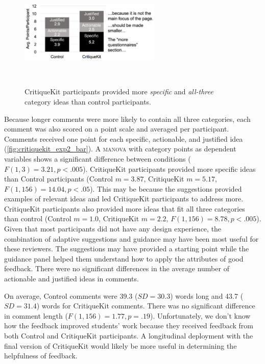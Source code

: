 \begin{figure}[b!]
\centering
  \includegraphics[width=0.6\textwidth]{critiquekit/figures/exp2_bar.png}
  \caption{CritiqueKit participants provided more \textit{specific} and \textit{all-three} category ideas than control participants.}~\label{fig:critiquekit_exp2_bar}
\end{figure}

Because longer comments were more likely to contain all three categories, each comment was also scored on a point scale and averaged per participant. Comments received one point for each specific, actionable, and justified idea (\autoref{fig:critiquekit_exp2_bar}). A \textsc{manova} with category points as dependent variables shows a significant difference between conditions ($F(1,3) = 3.21, p < .005$). CritiqueKit participants provided more specific ideas than Control participants (Control $m = 3.87$, CritiqueKit $m = 5.17$, $F(1,156) = 14.04, p  <  .05$). This may be because the suggestions provided examples of relevant ideas and led CritiqueKit participants to address more. CritiqueKit participants also provided more ideas that fit all three categories than control (Control $m = 1.0$, CritiqueKit $m = 2.2$, $F(1,156) = 8.78, p < .005$). Given that most participants did not have any design experience, the combination of adaptive suggestions and guidance may have been most useful for these reviewers. The suggestions may have provided a starting point while the guidance panel helped them understand how to apply the attributes of good feedback. There were no significant differences in the average number of actionable and justified ideas in comments.

On average, Control comments were 39.3 ($SD = 30.3$) words long and 43.7 ($SD = 31.4$) words for CritiqueKit comments. There was no significant difference in comment length ($F(1,156) = 1.77, p = .19$). Unfortunately, we don't know how the feedback improved students' work because they received feedback from both Control and CritiqueKit participants. A longitudinal deployment with the final version of CritiqueKit would likely be more useful in determining the helpfulness of feedback.

